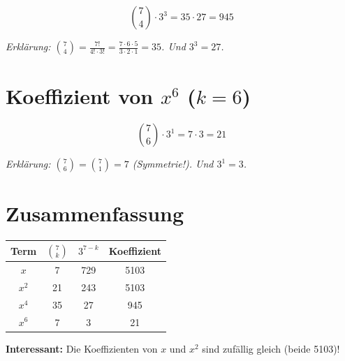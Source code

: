\documentclass[12pt, a4paper]{article}
\begin{document}
\[
    \binom{7}{4} \cdot 3^{3} = 35 \cdot 27 = \boxed{945}
\]

\textit{Erklärung: $\binom{7}{4} = \frac{7!}{4! \cdot 3!} = \frac{7 \cdot 6 \cdot 5}{3 \cdot 2 \cdot 1} = 35$. Und $3^3 = 27$.}

\section*{Koeffizient von $x^6$ ($k = 6$)}

\[
    \binom{7}{6} \cdot 3^{1} = 7 \cdot 3 = \boxed{21}
\]

\textit{Erklärung: $\binom{7}{6} = \binom{7}{1} = 7$ (Symmetrie!). Und $3^1 = 3$.}

\section*{Zusammenfassung}

\begin{center}
\begin{tabular}{c|c|c|c}
    Term & $\binom{7}{k}$ & $3^{7-k}$ & Koeffizient \\
    \hline
    $x$ & 7 & 729 & 5103 \\
    $x^2$ & 21 & 243 & 5103 \\
    $x^4$ & 35 & 27 & 945 \\
    $x^6$ & 7 & 3 & 21
\end{tabular}
\end{center}

\textbf{Interessant:} Die Koeffizienten von $x$ und $x^2$ sind zufällig gleich (beide 5103)!
\end{document}
